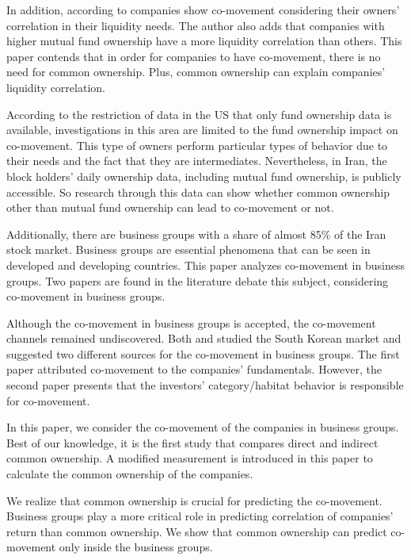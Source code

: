 	In addition, according to {\cite{Liquidity2016}} companies show co-movement considering their owners' correlation in their liquidity needs. The author also adds that companies with higher mutual fund ownership have a more liquidity correlation than others. This paper contends that in order for companies to have co-movement, there is no need for common ownership. Plus, common ownership can explain companies'  liquidity correlation. 





	According to the restriction of data in the US that only fund ownership data is available, investigations in this area are limited to the fund ownership impact on co-movement. This type of owners perform particular types of behavior due to their needs and the fact that they are intermediates.
	Nevertheless, in Iran, the block holders' daily ownership data, including mutual fund ownership, is publicly accessible. So research through this data can show whether common ownership other than mutual fund ownership can lead to co-movement or not.
	
	Additionally, there are business groups with a share of almost 85\% of the Iran stock market. Business groups are essential phenomena that can be seen in developed and developing countries. 
	This paper analyzes co-movement in business groups. Two papers are found in the literature debate this subject, considering co-movement in business groups.
	
	Although the co-movement in business groups is accepted, the co-movement channels remained undiscovered.
	Both {\cite{cho2015stock} and \cite{kim2015stock}} studied the South Korean market and suggested two different sources for the co-movement in business groups. The first paper attributed co-movement to the companies' fundamentals. However, the second paper presents that the investors' category/habitat behavior is responsible for co-movement.
	
	In this paper, we consider the co-movement of the companies in business groups. Best of our knowledge, it is the first study that compares direct and indirect common ownership.
	A modified measurement is introduced in this paper to calculate the common ownership of the companies. 
	
	We realize that common ownership is crucial for predicting the co-movement. Business groups play a more critical role in predicting correlation of companies' return than common ownership. We show that common ownership  can predict  co-movement only inside  the business groups.
	
